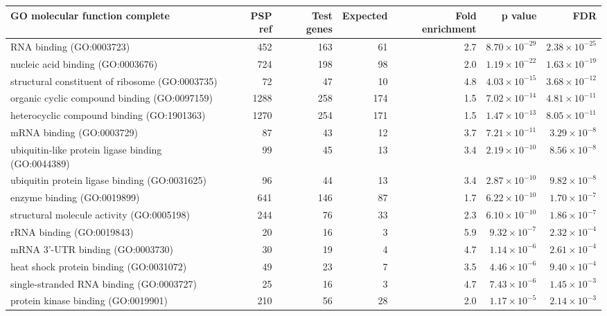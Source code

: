 \begin{table}[ht]
\centering
\begin{adjustbox}{width=\textwidth}

\begin{tabular}{lrrrrrr}
  \hline
GO molecular function complete & PSP ref & Test genes & Expected & Fold enrichment & p value & FDR \\ 
  \hline
RNA binding (GO:0003723) & 452 & 163 & 61 & 2.7 & $8.70 \times 10^{-29}$ & $2.38 \times 10^{-25}$ \\ 
  nucleic acid binding (GO:0003676) & 724 & 198 & 98 & 2.0 & $1.19 \times 10^{-22}$ & $1.63 \times 10^{-19}$ \\ 
  structural constituent of ribosome (GO:0003735) & 72 & 47 & 10 & 4.8 & $4.03 \times 10^{-15}$ & $3.68 \times 10^{-12}$ \\ 
  organic cyclic compound binding (GO:0097159) & 1288 & 258 & 174 & 1.5 & $7.02 \times 10^{-14}$ & $4.81 \times 10^{-11}$ \\ 
  heterocyclic compound binding (GO:1901363) & 1270 & 254 & 171 & 1.5 & $1.47 \times 10^{-13}$ & $8.05 \times 10^{-11}$ \\ 
  mRNA binding (GO:0003729) & 87 & 43 & 12 & 3.7 & $7.21 \times 10^{-11}$ & $3.29 \times 10^{-8}$ \\ 
  ubiquitin-like protein ligase binding (GO:0044389) & 99 & 45 & 13 & 3.4 & $2.19 \times 10^{-10}$ & $8.56 \times 10^{-8}$ \\ 
  ubiquitin protein ligase binding (GO:0031625) & 96 & 44 & 13 & 3.4 & $2.87 \times 10^{-10}$ & $9.82 \times 10^{-8}$ \\ 
  enzyme binding (GO:0019899) & 641 & 146 & 87 & 1.7 & $6.22 \times 10^{-10}$ & $1.70 \times 10^{-7}$ \\ 
  structural molecule activity (GO:0005198) & 244 & 76 & 33 & 2.3 & $6.10 \times 10^{-10}$ & $1.86 \times 10^{-7}$ \\ 
  rRNA binding (GO:0019843) & 20 & 16 & 3 & 5.9 & $9.32 \times 10^{-7}$ & $2.32 \times 10^{-4}$ \\ 
  mRNA 3'-UTR binding (GO:0003730) & 30 & 19 & 4 & 4.7 & $1.14 \times 10^{-6}$ & $2.61 \times 10^{-4}$ \\ 
  heat shock protein binding (GO:0031072) & 49 & 23 & 7 & 3.5 & $4.46 \times 10^{-6}$ & $9.40 \times 10^{-4}$ \\ 
  single-stranded RNA binding (GO:0003727) & 25 & 16 & 3 & 4.7 & $7.43 \times 10^{-6}$ & $1.45 \times 10^{-3}$ \\ 
  protein kinase binding (GO:0019901) & 210 & 56 & 28 & 2.0 & $1.17 \times 10^{-5}$ & $2.14 \times 10^{-3}$ \\ 

\end{tabular}
\end{adjustbox}
\end{table}
